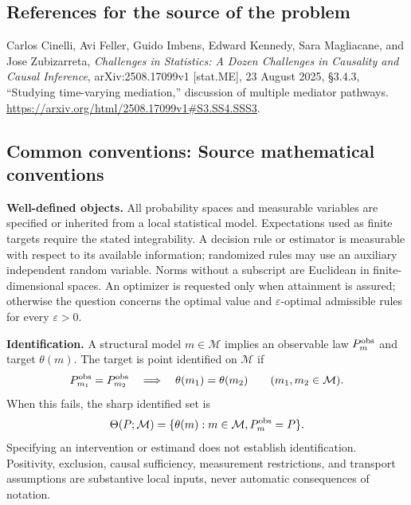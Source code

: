 \documentclass[11pt,a4paper]{article}
\begin{document}
\subsection*{References for the source of the problem}
Carlos Cinelli, Avi Feller, Guido Imbens, Edward Kennedy, Sara Magliacane, and Jose Zubizarreta, \emph{Challenges in Statistics: A Dozen Challenges in Causality and Causal Inference}, arXiv:2508.17099v1 [stat.ME], 23 August 2025, \S3.4.3, ``Studying time-varying mediation,'' discussion of multiple mediator pathways. \url{https://arxiv.org/html/2508.17099v1#S3.SS4.SSS3}.

\subsection*{Common conventions: Source mathematical conventions}

\textbf{Well-defined objects.}
All probability spaces and measurable variables are specified or inherited
from a local statistical model. Expectations used as finite targets require
the stated integrability. A decision rule or estimator is measurable with
respect to its available information; randomized rules may use an auxiliary
independent random variable. Norms without a subscript are Euclidean in
finite-dimensional spaces. An optimizer is requested only when attainment
is assured; otherwise the question concerns the optimal value and
$\varepsilon$-optimal admissible rules for every $\varepsilon>0$.

\textbf{Identification.}
A structural model $m\in\mathcal M$ implies an observable law
$P_m^{\rm obs}$ and target $\theta(m)$. The target is point identified on
$\mathcal M$ if
\[
 P_{m_1}^{\rm obs}=P_{m_2}^{\rm obs}
 \quad\Longrightarrow\quad\theta(m_1)=\theta(m_2)
 \qquad(m_1,m_2\in\mathcal M).
\]
When this fails, the sharp identified set is
\[
 \Theta(P;\mathcal M)=\{\theta(m):m\in\mathcal M,
                                  P_m^{\rm obs}=P\}.
\]
Specifying an intervention or estimand does not establish identification.
Positivity, exclusion, causal sufficiency, measurement restrictions, and
transport assumptions are substantive local inputs, never automatic
consequences of notation.
\end{document}
